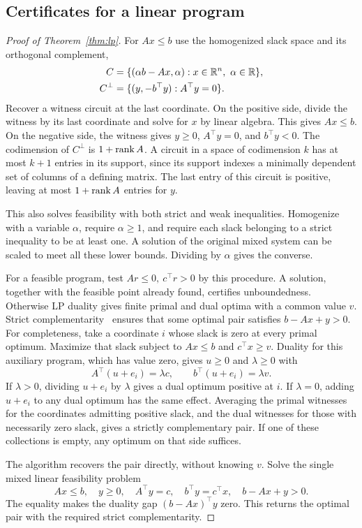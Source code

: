 \subsection{Certificates for a linear program}

\begin{proof}[Proof of Theorem~\ref{thm:lp}]
For \(Ax\le b\) use the homogenized slack space and its orthogonal
complement,
\[
 \begin{aligned}
 C      &=\{(\alpha b-Ax,\alpha): x\in\mathbb R^n,\ \alpha\in\mathbb R\},\\
 C^\perp&=\{(y,-b^\top y): A^\top y=0\}.
 \end{aligned}
\]
Recover a witness circuit at the last coordinate. On the positive
side, divide the witness by its last coordinate and solve for \(x\)
by linear algebra. This gives \(Ax\le b\). On the negative side,
the witness gives \(y\ge0\), \(A^\top y=0\), and \(b^\top y<0\).
The codimension of \(C^\perp\) is \(1+\operatorname{rank} A\). A circuit in a
space of codimension \(k\) has at most \(k+1\) entries in its
support, since its support indexes a minimally dependent set of
columns of a defining matrix. The last entry of this circuit is
positive, leaving at most \(1+\operatorname{rank} A\) entries for \(y\).

This also solves feasibility with both strict and weak inequalities.
Homogenize with a variable \(\alpha\), require \(\alpha\ge1\), and
require each slack belonging to a strict inequality to be at least
one. A solution of the original mixed system can be scaled to meet all
these lower bounds. Dividing by \(\alpha\) gives the converse.

For a feasible program, test \(Ar\le0,\ c^\top r>0\) by this
procedure. A solution, together with the feasible point already
found, certifies unboundedness. Otherwise LP duality gives finite
primal and dual optima with a common value \(v\). Strict
complementarity~\cite{GT} ensures that some optimal pair satisfies
\(b-Ax+y>0\). For completeness, take a coordinate \(i\) whose slack
is zero at every primal optimum. Maximize that slack subject to
\(Ax\le b\) and \(c^\top x\ge v\). Duality for this auxiliary
program, which has value zero, gives \(u\ge0\) and \(\lambda\ge0\)
with
\[
 A^\top(u+e_i)=\lambda c,\qquad b^\top(u+e_i)=\lambda v .
\]
If \(\lambda>0\), dividing \(u+e_i\) by \(\lambda\) gives a dual
optimum positive at \(i\). If \(\lambda=0\), adding \(u+e_i\) to
any dual optimum has the same effect. Averaging the primal witnesses
for the coordinates admitting positive slack, and the dual witnesses
for those with necessarily zero slack, gives a strictly complementary
pair. If one of these collections is empty, any optimum on that side
suffices.

The algorithm recovers the pair directly, without knowing \(v\).
Solve the single mixed linear feasibility problem
\[
 Ax\le b,\quad y\ge0,\quad A^\top y=c,\quad
 b^\top y=c^\top x,\quad b-Ax+y>0.
\]
The equality makes the duality gap \((b-Ax)^\top y\) zero. This
returns the optimal pair with the required strict complementarity.
\end{proof}

